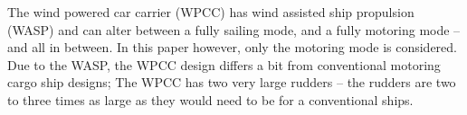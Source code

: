 The wind powered car carrier (WPCC) has wind assisted ship propulsion (WASP) and can alter between a fully sailing mode, and a fully motoring mode -- and all in between. 
In this paper however, only the motoring mode is considered. Due to the WASP, the WPCC design differs a bit from conventional motoring cargo ship designs; The WPCC has two very large rudders -- the rudders are two to three times as large as they would need to be for a conventional ships.